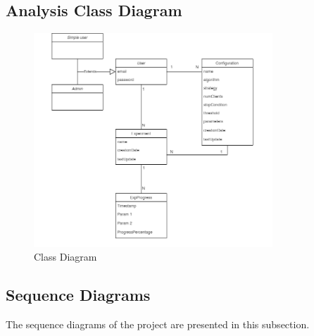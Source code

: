 \newpage
\subsection{Analysis Class Diagram}

\begin{figure}[ht!]
    \centering
    \includegraphics[width=0.8\textwidth]{images/2_analisys/FL_class_diag.png}
    \caption{Class Diagram}
    \label{fig:class_diagram}
\end{figure}

\subsection{Sequence Diagrams}

The sequence diagrams of the project are presented in this subsection.


